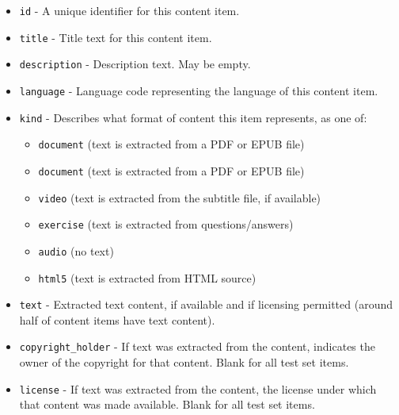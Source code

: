\documentclass{article}
\begin{document}
\begin{itemize}
    
\item  \texttt{id} - A unique identifier for this content item.

\item  \texttt{title} - Title text for this content item.

\item  \texttt{description} - Description text. May be empty.

\item  \texttt{language} - Language code representing the language of this content item.

\item  \texttt{kind} - Describes what format of content this item represents, as one of:

\begin{itemize}
    \item \texttt{document} (text is extracted from a PDF or EPUB file)
    \item \texttt{document} (text is extracted from a PDF or EPUB file)

    \item \texttt{video} (text is extracted from the subtitle file, if available)

     \item \texttt{exercise} (text is extracted from questions/answers)

    \item \texttt{audio} (no text)

    \item \texttt{html5} (text is extracted from HTML source)
    
\end{itemize}

\item  \texttt{text} - Extracted text content, if available and if licensing permitted (around half of content items have text content).

\item  \texttt{copyright\_holder} - If text was extracted from the content, indicates the owner of the copyright for that content. Blank for all test set items.

\item  \texttt{license} - If text was extracted from the content, the license under which that content was made available. Blank for all test set items.

\end{itemize}
\end{document}
